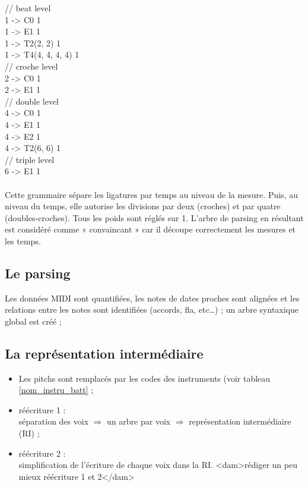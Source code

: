 // beat level\\
1 -> C0                1\\
1 -> E1                1\\
1 -> T2(2, 2)          1\\
1 -> T4(4, 4, 4, 4)    1\\

// croche level\\
2 -> C0                1\\
2 -> E1                1\\

// double level\\
4 -> C0                1\\
4 -> E1                1\\
4 -> E2                1\\
4 -> T2(6, 6)          1\\

// triple level\\
6 -> E1                1\\\\
Cette grammaire sépare les ligatures par temps au niveau de la mesure. Puis, au
niveau du temps, elle autorise les divisions par deux (croches) et par quatre
(doubles-croches). Tous les poids sont réglés sur 1. L’arbre de parsing en
résultant est considéré comme « convaincant » car il découpe correctement les
mesures et les temps.

\subsection*{Le parsing}
Les données MIDI sont quantifiées, les notes de dates proches sont alignées et
les relations entre les notes sont identifiées (accords, fla, etc…) ; un arbre
syntaxique global est créé ;

\subsection*{La représentation intermédiaire}
\begin{itemize}
    \item Les pitchs sont remplacés par les codes des instruments (voir tableau
    \ref{nom_instru_batt} ;
    \item réécriture 1 :\\
    séparation des voix $\Rightarrow$ un arbre par voix
    $\Rightarrow$ représentation intermédiaire (RI) ;
    \item réécriture 2 :\\
    simplification de l’écriture de chaque voix dans la RI.
    <dam>rédiger un peu mieux réécriture 1 et 2</dam>
\end{itemize}


